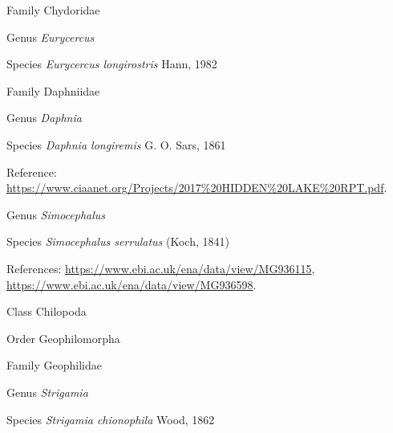 \documentclass[9pt, article]{memoir}
\begin{document}
\begin{multicols}{2}
\vspace{6pt}\noindent\hspace{24pt}Family Chydoridae


\vspace{6pt}\noindent\hspace{30pt}Genus \textit{Eurycercus}


\vspace{6pt}\noindent\hspace{36pt}Species \textit{Eurycercus longirostris} Hann, 1982


\vspace{6pt}\noindent\hspace{24pt}Family Daphniidae


\vspace{6pt}\noindent\hspace{30pt}Genus \textit{Daphnia}


\vspace{6pt}\noindent\hspace{36pt}Species \textit{Daphnia longiremis} G. O. Sars, 1861


Reference: 
\url{https://www.ciaanet.org/Projects/2017%20HIDDEN%20LAKE%20RPT.pdf}.

\vspace{6pt}\noindent\hspace{30pt}Genus \textit{Simocephalus}


\vspace{6pt}\noindent\hspace{36pt}Species \textit{Simocephalus serrulatus} (Koch, 1841)


References: 
\url{https://www.ebi.ac.uk/ena/data/view/MG936115}, 
\url{https://www.ebi.ac.uk/ena/data/view/MG936598}.

\vspace{6pt}\noindent\hspace{12pt}Class Chilopoda


\vspace{6pt}\noindent\hspace{18pt}Order Geophilomorpha


\vspace{6pt}\noindent\hspace{24pt}Family Geophilidae


\vspace{6pt}\noindent\hspace{30pt}Genus \textit{Strigamia}


\vspace{6pt}\noindent\hspace{36pt}Species \textit{Strigamia chionophila} Wood, 1862



\end{multicols}
\end{document}
